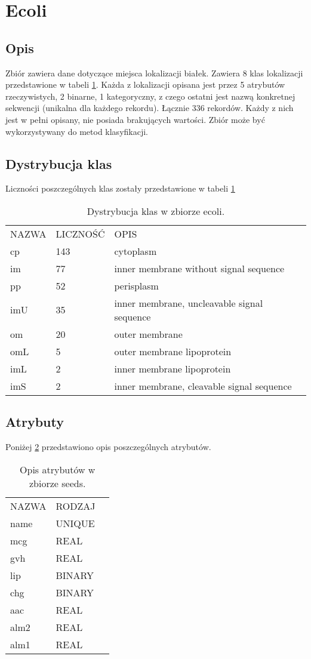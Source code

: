 \section{Ecoli}
	\subsection{Opis}
Zbiór zawiera dane dotyczące miejsca lokalizacji białek. Zawiera 8 klas lokalizacji przedstawione w tabeli \ref{dist-ecoli}. Każda z lokalizacji opisana jest przez 5 atrybutów rzeczywistych, 2 binarne, 1 kategoryczny, z czego ostatni jest nazwą konkretnej sekwencji (unikalna dla każdego rekordu). Łącznie 336 rekordów. Każdy z nich jest w pełni opisany, nie posiada brakujących wartości. Zbiór może być wykorzystywany do metod klasyfikacji.
	\subsection{Dystrybucja klas}
	Liczności poszczególnych klas zostały przedstawione w tabeli \ref{dist-ecoli}
\begin{table}[H]
\centering
\caption{Dystrybucja klas w zbiorze ecoli.}
\label{dist-ecoli}
\begin{tabular}{lll}
NAZWA & LICZNOŚĆ & OPIS \\
cp	& 143	& cytoplasm\\
im	& 77	& inner membrane without signal sequence\\
pp	& 52	& perisplasm\\
imU	& 35	& inner membrane, uncleavable signal sequence\\
om	& 20	& outer membrane\\
omL	& 5	 & outer membrane lipoprotein\\
imL	& 2	 & inner membrane lipoprotein\\
imS	& 2	 & inner membrane, cleavable signal sequence
\end{tabular}
\end{table}
	\subsection{Atrybuty}
	Poniżej \ref{attr-ecoli} przedstawiono opis poszczególnych atrybutów.
\begin{table}[H]
\centering
\caption{Opis atrybutów w zbiorze seeds.}
\label{attr-ecoli}
\begin{tabular}{lll}
NAZWA    	& RODZAJ \\
name	& UNIQUE	\\
mcg	& REAL \\
gvh & REAL \\
lip		& BINARY \\
chg	& BINARY \\
aac	& REAL \\
alm2	& REAL \\
alm1	& REAL
\end{tabular}
\end{table}
\newpage
